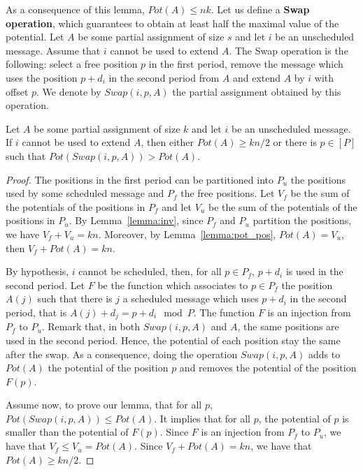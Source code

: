 \documentclass[a4paper,UKenglish,cleveref, autoref, thm-restate]{lipics-v2019}
\begin{document}
 As a consequence of this lemma, $Pot(A) \leq nk$. Let us define a \textbf{Swap operation},
 which guarantees to obtain at least half the maximal value of the potential.
Let $A$ be some partial assignment of size $s$ and let $i$ be an unscheduled message. 
Assume that $i$ cannot be used to extend $A$. The Swap operation is the following: 
select a free position $p$ in the first period, remove the message which uses the position $p+d_i$ in the second period from $A$ and extend $A$ by $i$ with offset $p$. We denote by $Swap(i,p,A)$ the partial assignment obtained by this operation.

\begin{lemma}\label{lemma:swap}
Let $A$ be some partial assignment of size $k$ and let $i$ be an unscheduled message. If $i$ cannot be used to extend $A$, then either $Pot(A) \geq kn/2$ or there is $p \in [P]$ such that $Pot(Swap(i,p,A)) > Pot(A)$.
\end{lemma}

\begin{proof}
The positions in the first period can be partitioned into $P_{u}$ the positions used by some scheduled message and $P_{f}$ the free positions.
Let $V_f$ be the sum of the potentials of the positions in $P_f$ and let $V_u$ be the sum of the potentials of the positions in $P_u$. By Lemma~\ref{lemma:inv}, since $P_f$ and $P_u$ partition the positions, we have $V_f + V_u = kn$. Moreover, by Lemma~\ref{lemma:pot_pos}, $Pot(A) = V_u$, then $V_f + Pot(A) = kn$.

By hypothesis, $i$ cannot be scheduled, then, for all $p \in P_{f}$, $p+d_i$ is used in the second period. Let $F$ be the function which associates to $p \in P_{f}$ the position $A(j)$ such that there is $j$ a scheduled message which uses $p+d_i$ in the second period, that is $A(j) + d_j = p + d_i \mod P$. The function $F$ is an injection from $P_{f}$ to $P_u$. Remark that, in both $Swap(i,p,A)$ and $A$, the same positions are used in the second period. Hence, the potential of each position stay the same after the swap. As a consequence, doing the operation $Swap(i,p,A)$ adds to $Pot(A)$ the potential of the position $p$ and removes the potential of the position $F(p)$. 

Assume now, to prove our lemma, that for all $p$, $Pot(Swap(i,p,A)) \leq Pot(A)$. It implies that for all $p$, the potential of $p$ is smaller than the potential of $F(p)$. Since $F$ is an injection from $P_f$ to $P_u$, we have that $V_f \leq V_u = Pot(A)$. Since $V_f + Pot(A) = kn$, we have that $Pot(A) \geq kn/2$.
\end{proof}
\end{document}
